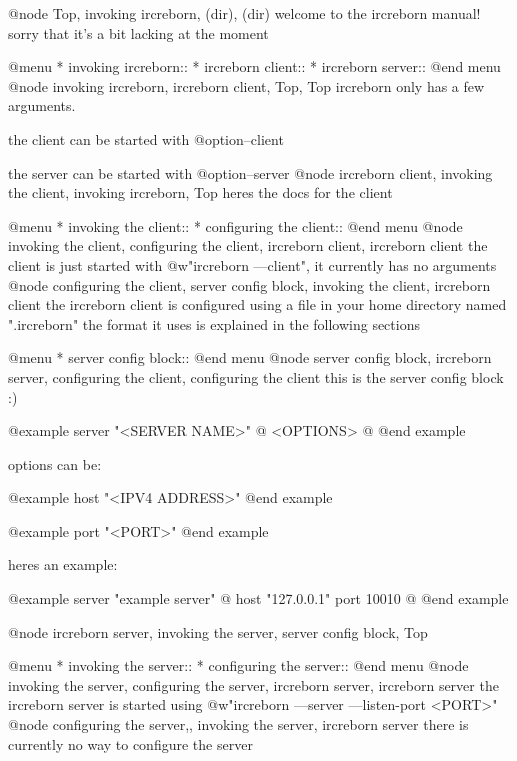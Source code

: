 
@node Top, invoking ircreborn, (dir), (dir)
welcome to the ircreborn manual! sorry that it's a bit lacking at the moment

@menu
* invoking ircreborn::
* ircreborn client::
* ircreborn server::
@end menu
@node invoking ircreborn, ircreborn client, Top, Top
ircreborn only has a few arguments.

the client can be started with @option{--client}

the server can be started with @option{--server}
@node ircreborn client, invoking the client, invoking ircreborn, Top
heres the docs for the client

@menu
* invoking the client::
* configuring the client::
@end menu
@node invoking the client, configuring the client, ircreborn client, ircreborn client
the client is just started with @w{"ircreborn ---client"}, it currently has no arguments
@node configuring the client, server config block, invoking the client, ircreborn client
the ircreborn client is configured using a file in your home directory named ".ircreborn"
the format it uses is explained in the following sections

@menu
* server config block::
@end menu
@node server config block, ircreborn server, configuring the client, configuring the client
this is the server config block :)

@example
server "<SERVER NAME>" @{
    <OPTIONS>
@}
@end example

options can be:

@example
host "<IPV4 ADDRESS>"
@end example

@example
port "<PORT>"
@end example

heres an example:

@example
server "example server" @{
    host "127.0.0.1"
    port 10010
@}
@end example

@node ircreborn server, invoking the server, server config block, Top

@menu
* invoking the server::
* configuring the server::
@end menu
@node invoking the server, configuring the server, ircreborn server, ircreborn server
the ircreborn server is started using @w{"ircreborn ---server ---listen-port <PORT>"}
@node configuring the server,, invoking the server, ircreborn server
there is currently no way to configure the server